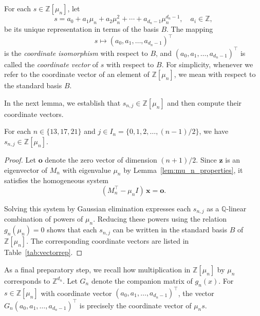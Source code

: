 For each $s \in \mathbb{Z}[\mu_n]$, let  
$$
s = a_0 + a_1 \mu_n + a_2 \mu_n^2 + \cdots + a_{d_n-1} \mu_n^{d_n-1}, 
\quad a_i \in \mathbb{Z},
$$  
be its unique representation in terms of the basis $B$. The mapping  
$$
s \longmapsto (a_0, a_1, \dots, a_{d_n-1})^\top
$$  
is the \textit{coordinate isomorphism} with respect to $B$, and $(a_0, a_1, \dots, a_{d_n-1})^\top$ is called the \textit{coordinate vector} of $s$ with respect to $B$. For simplicity, whenever we refer to the coordinate vector of an element of $\mathbb{Z}[\mu_n]$, we mean with respect to the standard basis $B$.

In the next lemma, we establish that $s_{n,j} \in \mathbb{Z}[\mu_n]$ and then compute their coordinate vectors.

\begin{lem}
For each \( n \in \{13, 17, 21\} \) and \( j \in I_n=\{0,1,2,\ldots,(n-1)/2\} \), we have \( s_{n,j} \in \mathbb{Z}[\mu_n] \).
\label{lem:s_n,j}
\end{lem}

\begin{proof}
Let \(\mathbf{o}\) denote the zero vector of dimension \((n+1)/2\). Since \(\mathbf{z}\) is an eigenvector of \(M_n\) with eigenvalue \(\mu_n\) by Lemma~\ref{lem:mu_n_properties}, it satisfies the homogeneous system
\[
(M_n^\top - \mu_n I)\,\mathbf{x} = \mathbf{o}.
\]

Solving this system by Gaussian elimination expresses each \(s_{n,j}\) as a \(\mathbb{Q}\)-linear combination of powers of \(\mu_n\). Reducing these powers using the relation \(g_n(\mu_n) = 0\) shows that each \(s_{n,j}\) can be written in the standard basis \(B\) of \(\mathbb{Z}[\mu_n]\). The corresponding coordinate vectors are listed in Table~\ref{tab:vectorrep}.
\end{proof}

As a final preparatory step,  we recall how multiplication in $\mathbb{Z}[\mu_n]$ by $\mu_n$ corresponds to $\mathbb{Z}^{d_n}$. Let $G_n$ denote the companion matrix of $g_n(x)$. For $s \in \mathbb{Z}[\mu_n]$ with coordinate vector $(a_0, a_1, \dots, a_{d_n - 1})^\top$, the vector $G_n(a_0, a_1, \dots, a_{d_n - 1})^\top$ is precisely the coordinate vector of $\mu_n s$. 

